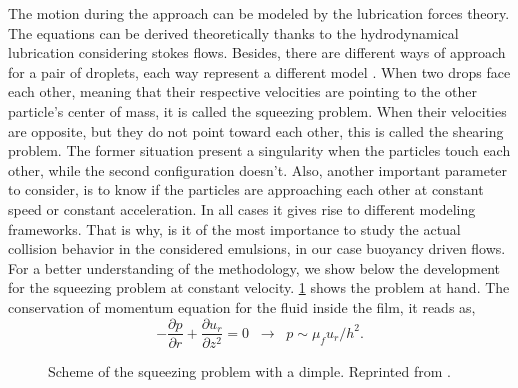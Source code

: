 The motion during the approach can be modeled by the lubrication forces theory.
The equations can be derived theoretically thanks to the hydrodynamical lubrication considering stokes flows.
Besides, there are different ways of approach for a pair of droplets, each way represent a different model \citep[Section 4.3]{guazzelli2011}. 
When two drops face each other, meaning that their respective velocities are pointing to the other particle's center of mass, it is called the squeezing problem.
When their velocities are opposite, but they do not point toward each other, this is called the shearing problem. 
The former situation present a singularity when the particles touch each other, while the second configuration doesn't. 
Also, another important parameter to consider, is to know if the particles are approaching each other at constant speed or constant acceleration.
In all cases it gives rise to different modeling frameworks.
That is why, is it of the most importance to study the actual collision behavior in the considered emulsions, in our case buoyancy driven flows.
For a better understanding of the methodology, we show below the development for the squeezing problem at constant velocity. 
\ref{fig:2drops} shows the problem at hand. 
The conservation of momentum equation for the fluid inside the film, it reads as,
\begin{equation*}
    - \frac{\partial p}{\partial r} 
    + \frac{\partial u_r}{\partial z^2} 
    = 0 
    \;\;\rightarrow 
    \;\; p \sim \mu_f u_r / h^2.
\end{equation*}
\begin{figure}[h!]
    \centering
    \caption{Scheme of the squeezing problem with a dimple. Reprinted from \citet{kamp2017drop}.}
    \label{fig:2drops}
\end{figure}
